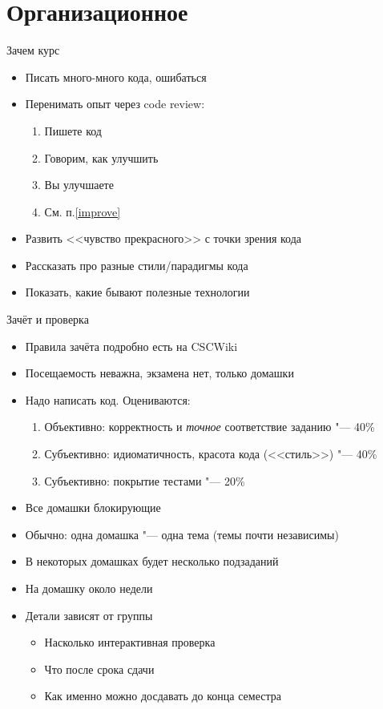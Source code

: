 \section{Организационное}
\begin{frame}[t]{Зачем курс}
	\begin{itemize}
		\item Писать много-много кода, ошибаться
		\item Перенимать опыт через code review:
			\begin{enumerate}
			\item Пишете код
			\item \label{improve} Говорим, как улучшить
			\item Вы улучшаете
			\item См. п.\ref{improve}
			\end{enumerate}
		\item Развить <<чувство прекрасного>> с точки зрения кода
		\item Рассказать про разные стили/парадигмы кода
		\item Показать, какие бывают полезные технологии
	\end{itemize}
\end{frame}

\begin{frame}[t]{Зачёт и проверка}
	\begin{itemize}
		\item Правила зачёта подробно есть на CSCWiki
		\item Посещаемость неважна, экзамена нет, только домашки
		\item Надо написать код. Оцениваются:
			\begin{enumerate}
			\item Объективно: корректность и \textit{точное} соответствие заданию "--- 40\%
			\item Субъективно: идиоматичность, красота кода (<<стиль>>) "--- 40\%
			\item Субъективно: покрытие тестами "--- 20\%
			\end{enumerate}
		\item Все домашки блокирующие
		\item Обычно: одна домашка "--- одна тема (темы почти независимы)
		\item В некоторых домашках будет несколько подзаданий
		\item На домашку около недели
		\item Детали зависят от группы
			\begin{itemize}
				\item Насколько интерактивная проверка
				\item Что после срока сдачи
				\item Как именно можно досдавать до конца семестра
			\end{itemize}
	\end{itemize}
\end{frame}

